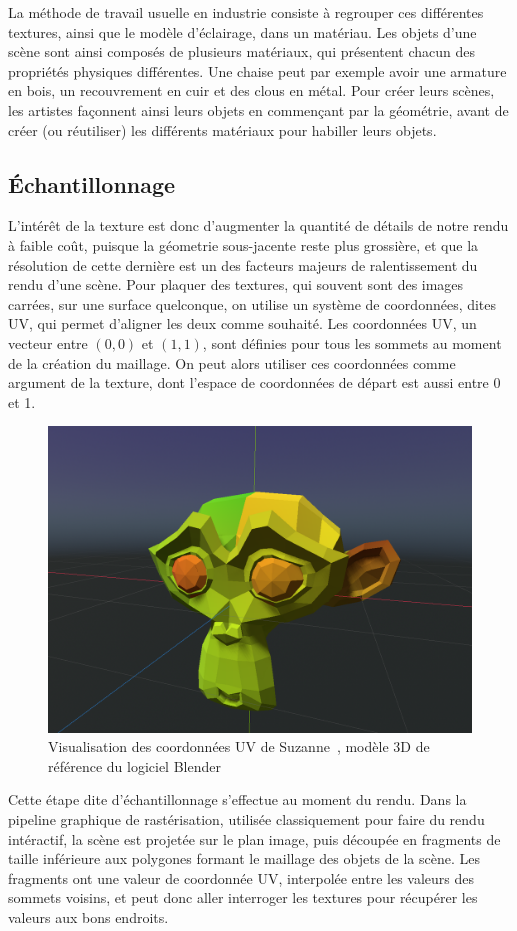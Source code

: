 La méthode de travail usuelle en industrie consiste à regrouper ces différentes textures, ainsi que le modèle d'éclairage, dans un matériau. Les objets d'une scène sont ainsi composés de plusieurs matériaux, qui présentent chacun des propriétés physiques différentes. Une chaise peut par exemple avoir une armature en bois, un recouvrement en cuir et des clous en métal. Pour créer leurs scènes, les artistes façonnent ainsi leurs objets en commençant par la géométrie, avant de créer (ou réutiliser) les différents matériaux pour habiller leurs objets.

\subsection*{Échantillonnage}

L'intérêt de la texture est donc d'augmenter la quantité de détails de notre rendu à faible coût, puisque la géometrie sous-jacente reste plus grossière, et que la résolution de cette dernière est un des facteurs majeurs de ralentissement du rendu d'une scène. Pour plaquer des textures, qui souvent sont des images carrées, sur une surface quelconque, on utilise un système de coordonnées, dites UV, qui permet d'aligner les deux comme souhaité. Les coordonnées UV, un vecteur entre $(0, 0)$ et $(1, 1)$, sont définies pour tous les sommets au moment de la création du maillage. On peut alors utiliser ces coordonnées comme argument de la texture, dont l'espace de coordonnées de départ est aussi entre 0 et 1.

\bigskip

\begin{figure}
    \centering
    \includegraphics[width=.55\textwidth]{contenu/resources/images/uv_suzanne}
    \caption[Coordonnées UV du modèle Suzanne]{Visualisation des coordonnées UV de Suzanne~\cite{suzanne-uv}, modèle 3D de référence du logiciel Blender}
    \label{fig:uv-suzanne}
\end{figure}

Cette étape dite d'échantillonnage s'effectue au moment du rendu. Dans la pipeline graphique de rastérisation, utilisée classiquement pour faire du rendu intéractif, la scène est projetée sur le plan image, puis découpée en fragments de taille inférieure aux polygones formant le maillage des objets de la scène. Les fragments ont une valeur de coordonnée UV, interpolée entre les valeurs des sommets voisins, et peut donc aller interroger les textures pour récupérer les valeurs aux bons endroits. 

